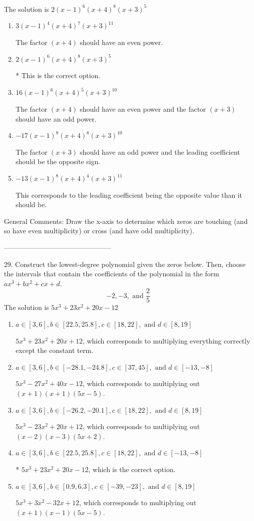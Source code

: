 \documentclass{article}[14pt]
\begin{document}
The solution is $ 2(x - 1)^{6} (x + 4)^{8} (x + 3)^{5} $ 

\begin{enumerate}[label=\Alph*.] 
\item $ 3(x - 1)^{4} (x + 4)^{7} (x + 3)^{11} $ 

 The factor $(x + 4)$ should have an even power. 
\item $ 2(x - 1)^{6} (x + 4)^{8} (x + 3)^{5} $ 

 * This is the correct option. 
\item $ 16(x - 1)^{6} (x + 4)^{5} (x + 3)^{10} $ 

 The factor $(x + 4)$ should have an even power and the factor $(x + 3)$ should have an odd power. 
\item $ -17(x - 1)^{8} (x + 4)^{8} (x + 3)^{10} $ 

 The factor $(x + 3)$ should have an odd power and the leading coefficient should be the opposite sign. 
\item $ -13(x - 1)^{8} (x + 4)^{4} (x + 3)^{11} $ 

 This corresponds to the leading coefficient being the opposite value than it should be. 
\end{enumerate} 
 
General Comments: Draw the x-axis to determine which zeros are touching (and so have even multiplicity) or cross (and have odd multiplicity).

-----------------------------------------------

29. Construct the lowest-degree polynomial given the zeros below. Then, choose the intervals that contain the coefficients of the polynomial in the form $ax^3+bx^2+cx+d$.
$$ -2, -3, \text{ and } \frac{2}{5} $$ 
The solution is $ 5x^{3} +23 x^{2} +20 x -12 $ 

\begin{enumerate}[label=\Alph*.] 
\item $ a \in [3, 6], b \in [22.5, 25.8], c \in [18, 22], \text{ and } d \in [8, 19] $ 

 $5x^{3} +23 x^{2} +20 x + 12$, which corresponds to multiplying everything correctly except the constant term. 
\item $ a \in [3, 6], b \in [-28.1, -24.8], c \in [37, 45], \text{ and } d \in [-13, -8] $ 

 $5x^{3} -27 x^{2} +40 x -12$, which corresponds to multiplying out $(x + 1)(x + 1)(5x -5)$. 
\item $ a \in [3, 6], b \in [-26.2, -20.1], c \in [18, 22], \text{ and } d \in [8, 19] $ 

 $5x^{3} -23 x^{2} +20 x + 12$, which corresponds to multiplying out $(x -2)(x -3)(5x + 2)$. 
\item $ a \in [3, 6], b \in [22.5, 25.8], c \in [18, 22], \text{ and } d \in [-13, -8] $ 

 * $5x^{3} +23 x^{2} +20 x -12$, which is the correct option. 
\item $ a \in [3, 6], b \in [0.9, 6.3], c \in [-39, -23], \text{ and } d \in [8, 19] $ 

 $5x^{3} +3 x^{2} -32 x + 12$, which corresponds to multiplying out $(x + 1)(x -1)(5x -5)$. 
\end{enumerate} 
 
\end{document}
